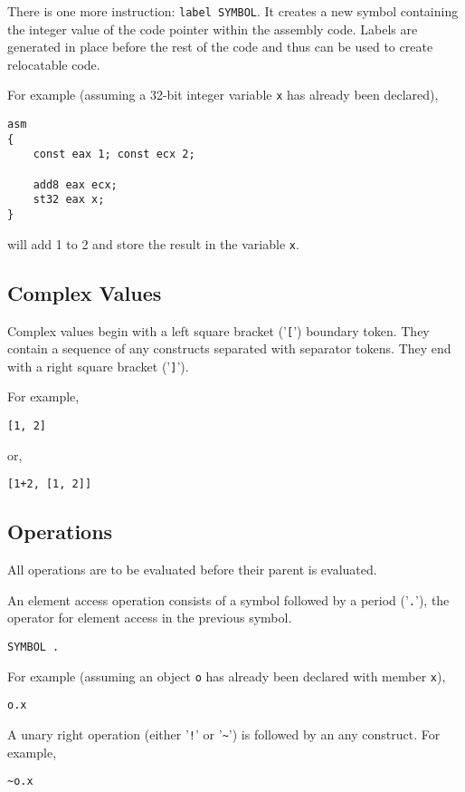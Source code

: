 \documentclass[10pt,a4paper]{article}
\begin{document}
There is one more instruction: \verb|label SYMBOL|. It creates a new symbol containing the integer value of the code pointer within the assembly code. Labels are generated in place before the rest of the code and thus can be used to create relocatable code.

For example (assuming a 32-bit integer variable \verb|x| has already been declared),
\begin{verbatim}
asm
{
    const eax 1; const ecx 2;
    
    add8 eax ecx;
    st32 eax x;
}
\end{verbatim}
will add 1 to 2 and store the result in the variable \verb|x|.

\subsection{Complex Values}
\label{sec:complexValues}
Complex values begin with a left square bracket ('\verb|[|') boundary token. They contain a sequence of any constructs separated with separator tokens. They end with a right square bracket ('\verb|]|').

For example,
\begin{verbatim}
[1, 2]
\end{verbatim}

or,
\begin{verbatim}
[1+2, [1, 2]]
\end{verbatim}

\subsection{Operations}
\label{sec:operations}
All operations are to be evaluated before their parent is evaluated.

An element access operation consists of a symbol followed by a period ('\verb|.|'), the operator for element access in the previous symbol.
\begin{verbatim}
SYMBOL .
\end{verbatim}

For example (assuming an object \verb|o| has already been declared with member \verb|x|),
\begin{verbatim}
o.x
\end{verbatim}

A unary right operation (either '\verb|!|' or '\verb|~|') is followed by an any construct. For example,
\begin{verbatim}
~o.x
\end{verbatim}
\end{document}
